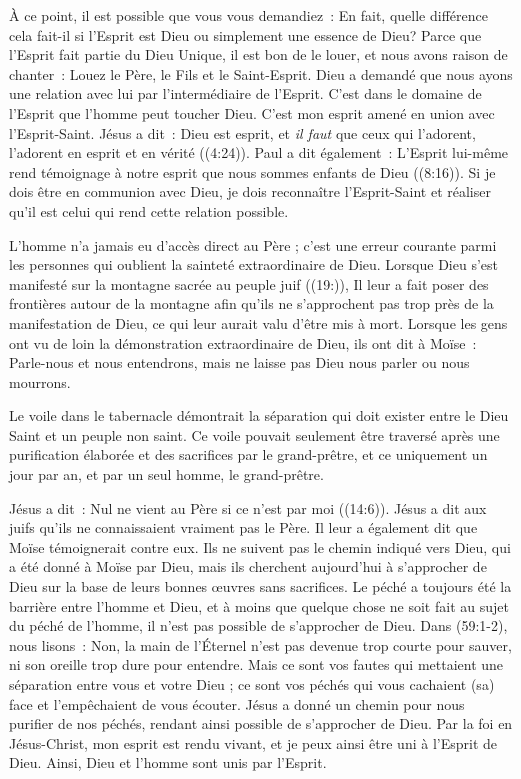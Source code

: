 À ce point, il est possible que vous vous demandiez~:
 \og En fait, quelle différence cela fait-il si l'Esprit est Dieu
 ou simplement une essence de Dieu? \fg{}
 Parce que l'Esprit fait partie du Dieu Unique, il est bon de le louer,
 et nous avons raison de chanter~:
 \og Louez le Père, le Fils et le Saint-Esprit. \fg{}
 Dieu a demandé que nous ayons une relation avec lui par l'intermédiaire
 de l'Esprit. C'est dans le domaine de l'Esprit que l'homme peut toucher Dieu.
 C'est mon esprit amené en union avec l'Esprit-Saint. Jésus a dit~:
 \og Dieu est esprit, et \emph{il faut} que ceux qui l'adorent, l'adorent en esprit
 et en vérité \fg{} ((4:24)).
 Paul a dit également~: \og L'Esprit lui-même rend témoignage à notre esprit
 que nous sommes enfants de Dieu \fg{} ((8:16)).
 Si je dois être en communion avec Dieu, je dois reconnaître l'Esprit-Saint
 et réaliser qu'il est celui qui rend cette relation possible.

L'homme n'a jamais eu d'accès direct au Père ; c'est une erreur courante parmi
 les personnes qui oublient la sainteté extraordinaire de Dieu.
 Lorsque Dieu s'est manifesté sur la montagne sacrée au peuple juif
 ((19:)), Il leur a fait poser des frontières autour de
 la montagne afin qu'ils ne s'approchent pas trop près de la manifestation
 de Dieu, ce qui leur aurait valu d'être mis à mort.
 Lorsque les gens ont vu de loin la démonstration extraordinaire de Dieu,
 ils ont dit à Moïse~:
 \og Parle-nous et nous entendrons, mais ne laisse pas Dieu nous parler
 ou nous mourrons. \fg{}

Le voile dans le tabernacle démontrait la séparation qui doit exister entre
 le Dieu Saint et un peuple non saint.
 Ce voile pouvait seulement être traversé après une purification élaborée
 et des sacrifices par le grand-prêtre, et ce uniquement un jour par an,
 et par un seul homme, le grand-prêtre.

Jésus a dit~: \og Nul ne vient au Père si ce n'est par moi \fg{}
 ((14:6)).
 Jésus a dit aux juifs qu'ils ne connaissaient vraiment pas le Père.
 Il leur a également dit que Moïse témoignerait contre eux.
 Ils ne suivent pas le chemin indiqué vers Dieu, qui a été donné
 à Moïse par Dieu, mais ils cherchent aujourd'hui à s'approcher de Dieu
 sur la base de leurs bonnes œuvres sans sacrifices.
 Le péché a toujours été la barrière entre l'homme et Dieu, et à moins
 que quelque chose ne soit fait au sujet du péché de l'homme,
 il n'est pas possible de s'approcher de Dieu.
 Dans (59:1-2), nous lisons~:
 \og Non, la main de l'Éternel n'est pas devenue trop courte pour sauver,
 ni son oreille trop dure pour entendre.
 Mais ce sont vos fautes qui mettaient une séparation entre vous et votre Dieu ;
 ce sont vos péchés qui vous cachaient (sa) face et l'empêchaient
 de vous écouter. \fg{}
 Jésus a donné un chemin pour nous purifier de nos péchés,
 rendant ainsi possible de s'approcher de Dieu.
 Par la foi en Jésus-Christ, mon esprit est rendu vivant, et je peux ainsi
 être uni à l'Esprit de Dieu. Ainsi, Dieu et l'homme sont unis par l'Esprit.
\closechapter

